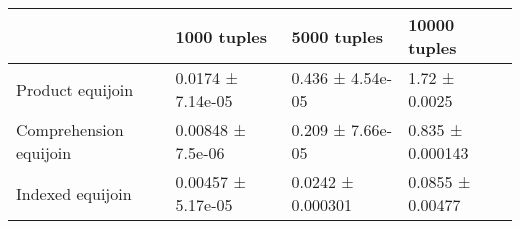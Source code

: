\begin{tabular}{llll}
\toprule
 & 1000 tuples & 5000 tuples & 10000 tuples \\
\midrule
Product equijoin & 0.0174 ± 7.14e-05 & 0.436 ± 4.54e-05 & 1.72 ± 0.0025 \\
Comprehension equijoin & 0.00848 ± 7.5e-06 & 0.209 ± 7.66e-05 & 0.835 ± 0.000143 \\
Indexed equijoin & 0.00457 ± 5.17e-05 & 0.0242 ± 0.000301 & 0.0855 ± 0.00477 \\
\bottomrule
\end{tabular}
